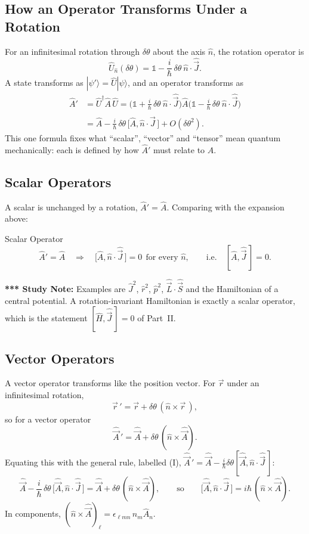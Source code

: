 \documentclass[11pt,a4paper]{article}
\begin{document}
\subsection{How an Operator Transforms Under a Rotation}
For an infinitesimal rotation through $\delta\theta$ about the axis $\hat n$, the rotation operator is
\[
\hat U_{\hat n}(\delta\theta)=\mathbb 1-\frac i\hbar\,\delta\theta\ \hat n\cdot\hat{\vec J}.
\]
A state transforms as $|\psi'\rangle=\hat U|\psi\rangle$, and an operator transforms as
\begin{align*}
\hat A'&=\hat U^\dagger\hat A\,\hat U=\Big(\mathbb 1+\frac i\hbar\,\delta\theta\ \hat n\cdot\hat{\vec J}\Big)\hat A\Big(\mathbb 1-\frac i\hbar\,\delta\theta\ \hat n\cdot\hat{\vec J}\Big)\\
&=\hat A-\frac i\hbar\,\delta\theta\,\big[\hat A,\hat n\cdot\hat{\vec J}\,\big]+O(\delta\theta^2).
\end{align*}
This one formula fixes what ``scalar'', ``vector'' and ``tensor'' mean quantum mechanically: each is defined by how $\hat A'$ must relate to $\hat A$.

\subsection{Scalar Operators}
A scalar is unchanged by a rotation, $\hat A'=\hat A$. Comparing with the expansion above:

\begin{thm}{Scalar Operator}
\[
\hat A'=\hat A\quad\Longrightarrow\quad\big[\hat A,\hat n\cdot\hat{\vec J}\,\big]=0\ \ \text{for every }\hat n,\qquad\text{i.e.}\quad[\hat A,\hat{\vec J}\,]=0 .
\]
\end{thm}

\textbf{*** Study Note:} Examples are $\hat J^2$, $\hat r^2$, $\hat p^2$, $\hat{\vec L}\cdot\hat{\vec S}$ and the Hamiltonian of a central potential. A rotation-invariant Hamiltonian is exactly a scalar operator, which is the statement $[\hat H,\hat{\vec J}\,]=0$ of Part~II.

\subsection{Vector Operators}
A vector operator transforms like the position vector. For $\vec r$ under an infinitesimal rotation,
\[
\vec r\,'=\vec r+\delta\theta\,(\hat n\times\vec r\,),
\]
so for a vector operator
\[
\hat{\vec A}\,'=\hat{\vec A}+\delta\theta\,(\hat n\times\hat{\vec A}).\tag{II}
\]
Equating this with the general rule, labelled (I), $\hat{\vec A}\,'=\hat{\vec A}-\frac i\hbar\delta\theta[\hat{\vec A},\hat n\cdot\hat{\vec J}\,]$:
\[
\hat{\vec A}-\frac i\hbar\,\delta\theta\,\big[\hat{\vec A},\hat n\cdot\hat{\vec J}\,\big]=\hat{\vec A}+\delta\theta\,(\hat n\times\hat{\vec A}),
\qquad\text{so}\qquad
\big[\hat{\vec A},\hat n\cdot\hat{\vec J}\,\big]=i\hbar\,(\hat n\times\hat{\vec A}).
\]
In components, $(\hat n\times\hat{\vec A})_\ell=\epsilon_{\ell mn}\,n_m\hat A_n$.
\end{document}
